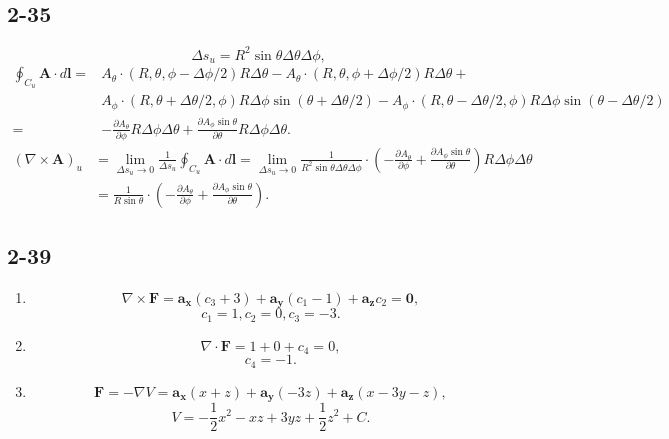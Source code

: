 \documentclass[11pt,a4paper]{article}
\begin{document}
\subsection{2-35}
$$\Delta s_u=R^2\sin\theta\Delta\theta\Delta\phi,$$
\begin{align*}
\oint_{C_u}\mathbf{A}\cdot d\mathbf{l}=&A_\theta\cdot(R,\theta,\phi-\Delta\phi/2)R\Delta\theta-A_\theta\cdot(R,\theta,\phi+\Delta\phi/2)R\Delta\theta+\\
&A_\phi\cdot(R,\theta+\Delta\theta/2,\phi)R\Delta\phi\sin(\theta+\Delta\theta/2)-A_\phi\cdot(R,\theta-\Delta\theta/2,\phi)R\Delta\phi\sin(\theta-\Delta\theta/2)\\
=&-\frac{\partial A_\theta}{\partial\phi}R\Delta\phi\Delta\theta+\frac{\partial A_\phi\sin\theta}{\partial\theta}R\Delta\phi\Delta\theta.
\end{align*}
\begin{align*}
(\nabla\times\mathbf{A})_u&=\lim_{\Delta s_u\to0}\frac{1}{\Delta s_u}\oint_{C_u}\mathbf{A}\cdot d\mathbf{l}=\lim_{\Delta s_u\to0}\frac{1}{R^2\sin\theta\Delta\theta\Delta\phi}\cdot\left(-\frac{\partial A_\theta}{\partial\phi}+\frac{\partial A_\phi\sin\theta}{\partial\theta}\right)R\Delta\phi\Delta\theta\\
&=\frac{1}{R\sin\theta}\cdot\left(-\frac{\partial A_\theta}{\partial\phi}+\frac{\partial A_\phi\sin\theta}{\partial\theta}\right).
\end{align*}
$$$$

\subsection{2-39}
\begin{enumerate}[label=\alph*)]
\item
$$\nabla\times\mathbf{F}=\mathbf{a_x}(c_3+3)+\mathbf{a_y}(c_1-1)+\mathbf{a_z}c_2=\mathbf{0},$$
$$c_1=1,c_2=0,c_3=-3.$$
\item
$$\nabla\cdot\mathbf{F}=1+0+c_4=0,$$
$$c_4=-1.$$
\item
$$\mathbf{F}=-\nabla V=\mathbf{a_x}(x+z)+\mathbf{a_y}(-3z)+\mathbf{a_z}(x-3y-z),$$
$$V=-\frac{1}{2}x^2-xz+3yz+\frac{1}{2}z^2+C.$$
\end{enumerate}
\end{document}
